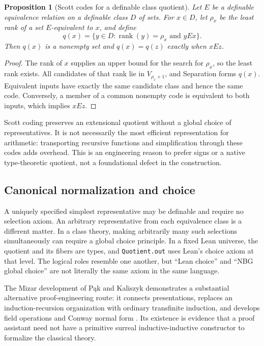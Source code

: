 \documentclass[11pt,letterpaper]{article}
\numberwithin{equation}{section}
\newtheorem{proposition}[theorem]{Proposition}
\theoremstyle{definition}
\theoremstyle{remark}
\newcommand{\rk}{\operatorname{rank}}
\begin{document}
\begin{proposition}[Scott codes for a definable class quotient]\label{prop:scott}
Let $E$ be a definable equivalence relation on a definable class $D$ of sets. For $x\in D$, let $\rho_x$ be the least rank of a set $E$-equivalent to $x$, and define
\[
 q(x)=\{y\in D:\rk(y)=\rho_x\text{ and }yEx\}.
\]
Then $q(x)$ is a nonempty set and $q(x)=q(z)$ exactly when $xEz$.
\end{proposition}
\begin{proof}
The rank of $x$ supplies an upper bound for the search for $\rho_x$, so the least rank exists. All candidates of that rank lie in $V_{\rho_x+1}$, and Separation forms $q(x)$. Equivalent inputs have exactly the same candidate class and hence the same code. Conversely, a member of a common nonempty code is equivalent to both inputs, which implies $xEz$.
\end{proof}

Scott coding preserves an extensional quotient without a global choice of representatives. It is not necessarily the most efficient representation for arithmetic: transporting recursive functions and simplification through these codes adds overhead. This is an engineering reason to prefer signs or a native type-theoretic quotient, not a foundational defect in the construction.

\subsection{Canonical normalization and choice}
A uniquely specified simplest representative may be definable and require no selection axiom. An arbitrary representative from each equivalence class is a different matter. In a class theory, making arbitrarily many such selections simultaneously can require a global choice principle. In a fixed Lean universe, the quotient and its fibers are types, and \texttt{Quotient.out} uses Lean's choice axiom at that level. The logical roles resemble one another, but ``Lean choice'' and ``NBG global choice'' are not literally the same axiom in the same language.

The Mizar development of P\k{a}k and Kaliszyk demonstrates a substantial alternative proof-engineering route: it connects presentations, replaces an induction-recursion organization with ordinary transfinite induction, and develops field operations and Conway normal form \cite{PakKaliszyk}. Its existence is evidence that a proof assistant need not have a primitive surreal inductive-inductive constructor to formalize the classical theory.
\end{document}
